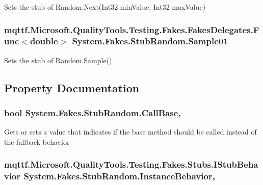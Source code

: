 Sets the stub of Random.\-Next(\-Int32 min\-Value, Int32 max\-Value)

\hypertarget{class_system_1_1_fakes_1_1_stub_random_ad92271d242b1d4ce7948697d4a0239ff}{
\subsubsection[{Sample01}]{\setlength{\rightskip}{0pt plus 5cm}mqttf.\-Microsoft.\-Quality\-Tools.\-Testing.\-Fakes.\-Fakes\-Delegates.\-Func$<$double$>$ System.\-Fakes.\-Stub\-Random.\-Sample01}}\label{class_system_1_1_fakes_1_1_stub_random_ad92271d242b1d4ce7948697d4a0239ff}


Sets the stub of Random.\-Sample()



\subsection{Property Documentation}
\hypertarget{class_system_1_1_fakes_1_1_stub_random_af15ddeb565b16955718a5559e13f8cd5}{
\subsubsection[{Call\-Base}]{\setlength{\rightskip}{0pt plus 5cm}bool System.\-Fakes.\-Stub\-Random.\-Call\-Base\hspace{0.3cm}{\ttfamily [get]}, {\ttfamily [set]}}}\label{class_system_1_1_fakes_1_1_stub_random_af15ddeb565b16955718a5559e13f8cd5}


Gets or sets a value that indicates if the base method should be called instead of the fallback behavior

\hypertarget{class_system_1_1_fakes_1_1_stub_random_a69ee08d91c19ef3b641a5bcef61a13ce}{
\subsubsection[{Instance\-Behavior}]{\setlength{\rightskip}{0pt plus 5cm}mqttf.\-Microsoft.\-Quality\-Tools.\-Testing.\-Fakes.\-Stubs.\-I\-Stub\-Behavior System.\-Fakes.\-Stub\-Random.\-Instance\-Behavior\hspace{0.3cm}{\ttfamily [get]}, {\ttfamily [set]}}}\label{class_system_1_1_fakes_1_1_stub_random_a69ee08d91c19ef3b641a5bcef61a13ce}


